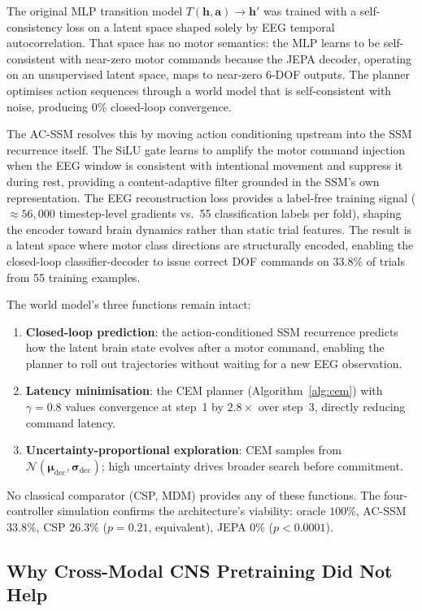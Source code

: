 \documentclass[journal]{IEEEtran}
\begin{document}
The original MLP transition model $T(\mathbf{h}, \mathbf{a}) \to \mathbf{h}'$ was trained with a self-consistency loss on a latent space shaped solely by EEG temporal autocorrelation.
That space has no motor semantics: the MLP learns to be self-consistent with near-zero motor commands because the JEPA decoder, operating on an unsupervised latent space, maps to near-zero 6-DOF outputs.
The planner optimises action sequences through a world model that is self-consistent with noise, producing $0\%$ closed-loop convergence.

The AC-SSM resolves this by moving action conditioning upstream into the SSM recurrence itself.
The SiLU gate learns to amplify the motor command injection when the EEG window is consistent with intentional movement and suppress it during rest, providing a content-adaptive filter grounded in the SSM's own representation.
The EEG reconstruction loss provides a label-free training signal ($\approx 56{,}000$ timestep-level gradients vs.\ 55 classification labels per fold), shaping the encoder toward brain dynamics rather than static trial features.
The result is a latent space where motor class directions are structurally encoded, enabling the closed-loop classifier-decoder to issue correct DOF commands on $33.8\%$ of trials from 55 training examples.

The world model's three functions remain intact:
\begin{enumerate}
  \item \textbf{Closed-loop prediction}: the action-conditioned SSM recurrence predicts how the latent brain state evolves after a motor command, enabling the planner to roll out trajectories without waiting for a new EEG observation.
  \item \textbf{Latency minimisation}: the CEM planner (Algorithm~\ref{alg:cem}) with $\gamma=0.8$ values convergence at step~1 by $2.8\times$ over step~3, directly reducing command latency.
  \item \textbf{Uncertainty-proportional exploration}: CEM samples from $\mathcal{N}(\bm\mu_\text{dec}, \bm\sigma_\text{dec})$; high uncertainty drives broader search before commitment.
\end{enumerate}

No classical comparator (CSP, MDM) provides any of these functions.
The four-controller simulation confirms the architecture's viability: oracle $100\%$, AC-SSM $33.8\%$, CSP $26.3\%$ ($p=0.21$, equivalent), JEPA $0\%$ ($p{<}0.0001$).

\subsection{Why Cross-Modal CNS Pretraining Did Not Help}
\label{sec:cns}
\end{document}
